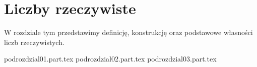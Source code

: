 \chapter{Liczby rzeczywiste}
W rozdziale tym przedstawimy definicję, konstrukcję oraz podstawowe własności liczb rzeczywistych.

{podrozdzial01.part.tex}
{podrozdzial02.part.tex}
{podrozdzial03.part.tex}
